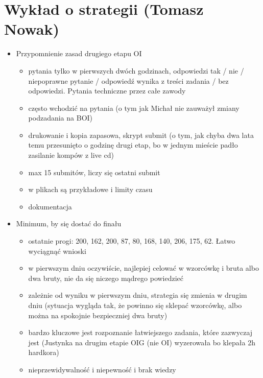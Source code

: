 \documentclass{article}
\begin{document}
\section*{Wykład o strategii (Tomasz Nowak)}

\begin{itemize}
    \item Przypomnienie zasad drugiego etapu OI
    \begin{itemize}
        \item pytania tylko w pierwszych dwóch godzinach, odpowiedzi tak / nie / niepoprawne pytanie / odpowiedź wynika z treści zadania / bez odpowiedzi. Pytania techniczne przez całe zawody
        \item często wchodzić na pytania (o tym jak Michał nie zauważył zmiany podzadania na BOI)
        \item drukowanie i kopia zapasowa, skrypt submit (o tym, jak chyba dwa lata temu przesunięto o godzinę drugi etap, bo w jednym mieście padło zasilanie kompów z live cd)
        \item max 15 submitów, liczy się ostatni submit
        \item w plikach są przykładowe i limity czasu
        \item dokumentacja
    \end{itemize}
    
    \item Minimum, by się dostać do finału
    \begin{itemize}
        \item ostatnie progi: 200, 162, 200, 87, 80, 168, 140, 206, 175, 62. Łatwo wyciągnąć wnioski
        \item w pierwszym dniu oczywiście, najlepiej celować w wzorcówkę i bruta albo dwa bruty, nie da się niczego mądrego powiedzieć
        \item zależnie od wyniku w pierwszym dniu, strategia się zmienia w drugim dniu (sytuacja wygląda tak, że powinno się sklepać wzorcówkę, albo można na spokojnie bezpieczniej dwa bruty)
        \item bardzo kluczowe jest rozpoznanie łatwiejszego zadania, które zazwyczaj jest (Justynka na drugim etapie OIG (nie OI) wyzerowała bo klepała 2h hardkora)
        \item nieprzewidywalność i niepewność i brak wiedzy
    \end{itemize}
    

\end{itemize}
\end{document}
